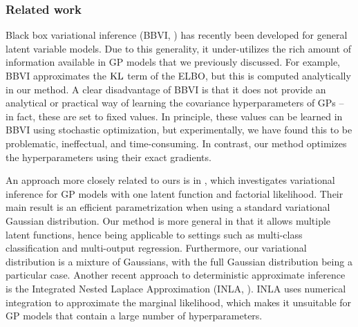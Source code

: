 \subsubsection*{Related work}
%
Black box variational inference (BBVI, \cite{ranganath2014black}) has recently been  developed for general latent variable models.
Due to this generality, it under-utilizes the rich amount of information available in GP models that we previously discussed.
For example, BBVI approximates the $\text{KL}$ term of the ELBO, but this is  computed analytically in our method. 
A clear disadvantage of BBVI is that it does not provide an analytical or practical way of learning the covariance hyperparameters of GPs -- in fact, these are set to fixed values.
In principle, these values can be learned in BBVI using stochastic optimization, but experimentally, we have found this to be problematic, ineffectual, and time-consuming.
In contrast, our method optimizes the hyperparameters using their exact gradients. %

An approach more closely related to ours is in \cite{opper-arch-nc-2009},  
which investigates variational inference for GP models with one latent function and factorial likelihood.
Their main result is an efficient parametrization when using a standard  variational Gaussian distribution. 
Our method is more general in that it allows multiple latent functions, 
 hence being applicable to settings  such as multi-class classification and multi-output regression.
Furthermore, our variational distribution is a mixture of Gaussians, with 
the full Gaussian distribution being a particular case.
Another recent approach to deterministic approximate inference  is the Integrated 
Nested Laplace Approximation (INLA, \cite{rue2009approximate}).
INLA uses numerical integration to approximate the marginal likelihood, %
which makes it unsuitable for GP models that  contain a large number of hyperparameters. 

  



